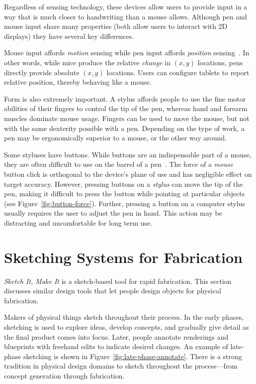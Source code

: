 Regardless of sensing technology, these devices allow users to provide
input in a way that is much closer to handwriting than a mouse
allows. Although pen and mouse input share many properties (both allow
users to interact with 2D displays) they have several key differences.

Mouse input affords \textit{motion} sensing while pen input
affords \textit{position} sensing~\cite{hinckley-input-technology}. In
other words, while mice produce the relative \textit{change} in
$(x,y)$ locations, pens directly provide absolute $(x,y)$ locations.
Users can configure tablets to report relative position, thereby
behaving like a mouse.

Form is also extremely important. A stylus affords people to use the
fine motor abilities of their fingers to control the tip of the pen,
whereas hand and forearm muscles dominate mouse usage. Fingers can be
used to move the mouse, but not with the same dexterity possible with
a pen. Depending on the type of work, a pen may be ergonomically
superior to a mouse, or the other way around.



Some styluses have buttons. While buttons are an indispensable part of
a mouse, they are often difficult to use on the barrel of a
pen~\cite{plimmer-pen-usability}. The force of a \textit{mouse} button
click is orthogonal to the device's plane of use and has negligible
effect on target accuracy. However, pressing buttons on a
\textit{stylus} can move the tip of the pen, making it difficult to
press the button while pointing at particular objects (see
Figure~\ref{fig:button-force}). Further, pressing a button on a
computer stylus usually requires the user to adjust the pen in
hand. This action may be distracting and uncomfortable for long term
use.

\section{Sketching Systems for Fabrication}

\textit{Sketch It, Make It} is a sketch-based tool for rapid
fabrication. This section discusses similar design tools that let
people design objects for physical fabrication. 

Makers of physical things sketch throughout their process. In the
early phases, sketching is used to explore ideas, develop concepts,
and gradually give detail as the final product comes into
focus. Later, people annotate renderings and blueprints with freehand
edits to indicate desired changes. An example of late-phase sketching
is shown in Figure~\ref{fig:late-phase-annotate}. There is a strong
tradition in physical design domains to sketch throughout the
process---from concept generation through fabrication.

